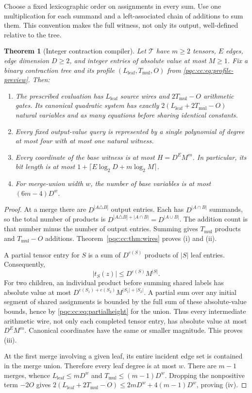 \documentclass[11pt,letterpaper]{article}
\numberwithin{equation}{section}
\newtheorem{theorem}{Theorem}[section]
\theoremstyle{definition}
\theoremstyle{remark}
\newcommand{\Lleaf}{L_{\mathrm{leaf}}}
\newcommand{\Tmul}{T_{\mathrm{mul}}}
\begin{document}
Choose a fixed lexicographic order on assignments in every sum. Use one
multiplication for each summand and a left-associated chain of additions to
sum them. This convention makes the full witness, not only its output,
well-defined relative to the tree.

\begin{theorem}[Integer contraction compiler]
\label{pqc:cc:thm:integer-tensor}
Let $\mathcal T$ have $m\ge2$ tensors, $E$ edges, edge dimension $D\ge2$, and
integer entries of absolute value at most $M\ge1$. Fix a binary contraction
tree and its profile $(\Lleaf,\Tmul,O)$ from \eqref{pqc:cc:eq:profile-preview}. Then:
\begin{enumerate}[label=(\roman*)]
\item The prescribed evaluation has $\Lleaf$ source wires and $2\Tmul-O$ arithmetic
gates. Its canonical quadratic system has exactly $2(\Lleaf+2\Tmul-O)$ natural
variables and as many equations before sharing identical constants.
\item Every fixed output-value query is represented by a single polynomial
of degree at most four with at most one natural witness.
\item Every coordinate of the base witness is at most
$H=D^E M^m$. In particular, its bit length is at most
$1+\lceil E\log_2D+m\log_2M\rceil$.
\item For merge-union width $w$, the number of base variables is at most
$(6m-4)D^w$.
\end{enumerate}
\end{theorem}
\begin{proof}
At a merge there are $D^{|A\triangle B|}$ output entries. Each has
$D^{|A\cap B|}$ summands, so the total number of products is
$D^{|A\triangle B|+|A\cap B|}=D^{|A\cup B|}$. The addition count is that
number minus the number of output entries. Summing gives $\Tmul$ products and
$\Tmul-O$ additions. Theorem~\ref{pqc:cc:thm:wires} proves (i) and (ii).

A partial tensor entry for $S$ is a sum of $D^{e(S)}$ products of $|S|$ leaf
entries. Consequently,
\begin{equation}
 |t_S(z)|\le D^{e(S)}M^{|S|}.
\label{pqc:cc:eq:partialheight}
\end{equation}
For two children, an individual product before summing shared labels has
absolute value at most
$D^{e(S_1)+e(S_2)}M^{|S_1|+|S_2|}$. A partial sum over any initial segment
of shared assignments is bounded by the full sum of these absolute-value
bounds, hence by \eqref{pqc:cc:eq:partialheight} for the union. Thus every
intermediate arithmetic wire, not only each completed tensor entry, has
absolute value at most $D^E M^m$. Canonical coordinates have the same or smaller
magnitude. This proves (iii).

At the first merge involving a given leaf, its entire incident edge set is
contained in the merge union. Therefore every leaf degree is at most $w$.
There are $m-1$ merges, whence $\Lleaf\le mD^w$ and $\Tmul\le(m-1)D^w$. Dropping the
nonpositive term $-2O$ gives
$2(\Lleaf+2\Tmul-O)\le 2mD^w+4(m-1)D^w$, proving (iv).
\end{proof}
\end{document}
